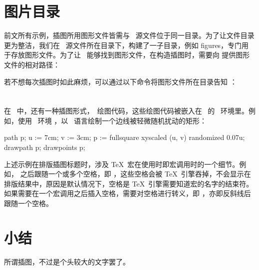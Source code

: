 \starttyping[option=TEX]
\stoptyping
{}

\section{图片目录}

前文所有示例，插图所用图形文件皆需与 \ConTeXt\ 源文件位于同一目录。为了让文件目录更为整洁，我们在 \ConTeXt\ 源文件所在目录下，构建了一子目录，例如 figures，专门用于存放图形文件。为了让 \ConTeXt\ 能够找到图形文件，在构造插图时，需要向 \type{\externalfigure} 提供图形文件的相对路径：

\starttyping[option=TEX]
\stoptyping

若不想每次插图时如此麻烦，可以通过以下命令将图形文件所在目录告知 \ConTeXt：

\starttyping[option=TEX]
\setupexternalfigures[directory={./figures}]
\stoptyping

\section{\MetaFun}

在 \ConTeXt\ 中，还有一种插图形式，\METAPOST\ 绘图代码，这些绘图代码被嵌入在 \ConTeXt\ 的 \MetaFun\ 环境里。例如，使用 \MetaFun\ 环境 ，以 \METAPOST\ 语言绘制一个边线被轻微随机扰动的矩形：

\starttyping[option=TEX]
path p;
u := 7cm; v := 3cm;
p := fullsquare xyscaled (u, v) randomized 0.07u;
drawpath p;
drawpoints p;
\stopuseMPgraphic
{}
\stoptyping
{}

上述示例在排版插图标题时，涉及 \TeX\ 宏在使用时即宏调用时的一个细节。例如，\type{\TeX} 之后跟随一个或多个空格，即 \type[space=on]{\TeX    }，这些空格会被 \TeX\ 引擎吞掉，不会显示在排版结果中，原因是默认情况下，空格是 \TeX\ 引擎需要知道宏的名字的结束符。如果需要在一个宏调用之后插入空格，需要对空格进行转义，即 \type[space=on]{\ }，亦即反斜线后跟随一个空格。

\section{小结}

所谓插图，不过是个头较大的文字罢了。
